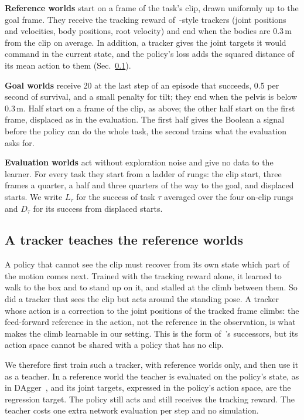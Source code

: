 \textbf{Reference worlds} start on a frame of the task's clip, drawn uniformly up to the goal frame. They receive the tracking reward of~\cite{deepmimic}-style trackers (joint positions and velocities, body positions, root velocity) and end when the bodies are 0.3\,m from the clip on average. In addition, a tracker gives the joint targets it would command in the current state, and the policy's loss adds the squared distance of its mean action to them (Sec.~\ref{sec:tracker}).

\textbf{Goal worlds} receive 20 at the last step of an episode that succeeds, 0.5 per second of survival, and a small penalty for tilt; they end when the pelvis is below 0.3\,m. Half start on a frame of the clip, as above; the other half start on the first frame, displaced as in the evaluation. The first half gives the Boolean a signal before the policy can do the whole task, the second trains what the evaluation asks for.

\textbf{Evaluation worlds} act without exploration noise and give no data to the learner. For every task they start from a ladder of rungs: the clip start, three frames a quarter, a half and three quarters of the way to the goal, and displaced starts. We write $L_\tau$ for the success of task $\tau$ averaged over the four on-clip rungs and $D_\tau$ for its success from displaced starts.

\subsection{A tracker teaches the reference worlds}
\label{sec:tracker}

A policy that cannot see the clip must recover from its own state which part of the motion comes next. Trained with the tracking reward alone, it learned to walk to the box and to stand up on it, and stalled at the climb between them. So did a tracker that sees the clip but acts around the standing pose. A tracker whose action is a correction to the joint positions of the tracked frame climbs: the feed-forward reference in the action, not the reference in the observation, is what makes the climb learnable in our setting. This is the form of~\cite{deepmimic}'s successors, but its action space cannot be shared with a policy that has no clip.

We therefore first train such a tracker, with reference worlds only, and then use it as a teacher. In a reference world the teacher is evaluated on the policy's state, as in DAgger~\cite{dagger}, and its joint targets, expressed in the policy's action space, are the regression target. The policy still acts and still receives the tracking reward. The teacher costs one extra network evaluation per step and no simulation.

